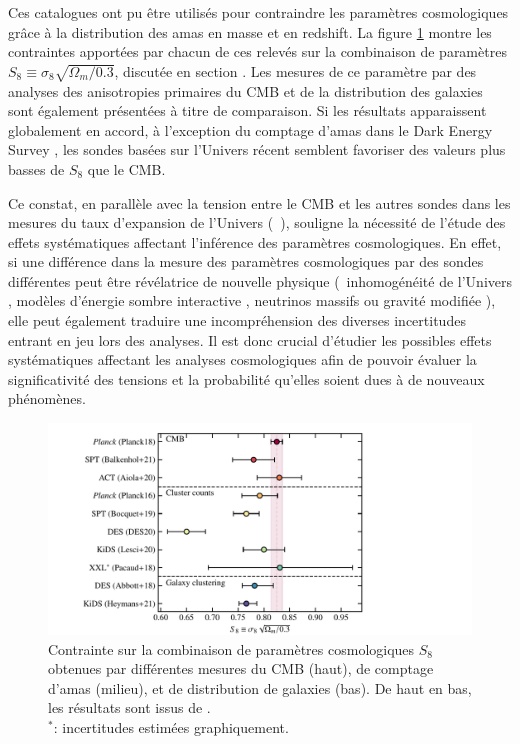 Ces catalogues ont pu être utilisés pour contraindre les paramètres cosmologiques grâce à la distribution des amas en masse et en redshift.
La figure \ref{fig:cluster_S8} montre les contraintes apportées par chacun de ces relevés sur la combinaison de paramètres $S_8 \equiv \sigma_8 \sqrt{\Omega_m/0.3}$, discutée en section .
Les mesures de ce paramètre par des analyses des anisotropies primaires du CMB et de la distribution des galaxies sont également présentées à titre de comparaison.
Si les résultats apparaissent globalement en accord, à l'exception du comptage d'amas dans le Dark Energy Survey \cite{des_collaboration_dark_2020}, les sondes basées sur l'Univers récent semblent favoriser des valeurs plus basses de $S_8$ que le CMB.

Ce constat, en parallèle avec la tension entre le CMB et les autres sondes dans les mesures du taux d'expansion de l'Univers (\eg\ \cite{riess_large_2019,wong_h0licow_2020,efstathiou_h0_2021}), souligne la nécessité de l'étude des effets systématiques affectant l'inférence des paramètres cosmologiques.
En effet, si une différence dans la mesure des paramètres cosmologiques par des sondes différentes peut être révélatrice de nouvelle physique (\eg\ inhomogénéité de l'Univers \cite{bohringer_observational_2020}, modèles d'énergie sombre interactive \cite{di_valentino_interacting_2020}, neutrinos massifs \cite{bolliet_including_2020} ou gravité modifiée \cite{cataneo_tests_2018}), elle peut également traduire une incompréhension des diverses incertitudes entrant en jeu lors des analyses.
Il est donc crucial d'étudier les possibles effets systématiques affectant les analyses cosmologiques afin de pouvoir évaluer la significativité des tensions et la probabilité qu'elles soient dues à de nouveaux phénomènes.

\begin{figure}[t]
    \centering
    \includegraphics[width=.9\linewidth]{Figures/Chap_amas/S8.pdf}
    \caption{
        Contrainte sur la combinaison de paramètres cosmologiques $S_8$ obtenues par différentes mesures du CMB (haut), de comptage d'amas (milieu), et de distribution de galaxies (bas).
        De haut en bas, les résultats sont issus de \cite{planck_collaboration_planck_2020}\cite{balkenhol_constraints_2021}\cite{aiola_atacama_2020}\cite{planck_collaboration_planck_2016-2}\cite{bocquet_cluster_2019}\cite{des_collaboration_dark_2020}\cite{lesci_amico_2020}\cite{pacaud_xxl_2018}\cite{abbott_dark_2018}\cite{heymans_kids-1000_2021}. \\
        $^*$: incertitudes estimées graphiquement.
    }
    \label{fig:cluster_S8}
\end{figure}


